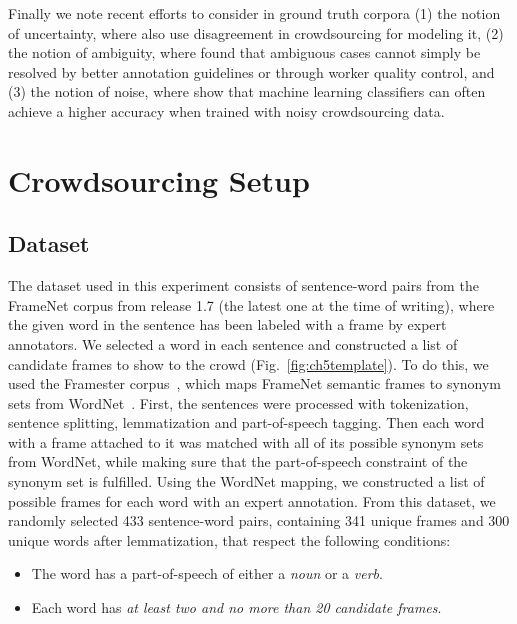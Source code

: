 Finally we note recent efforts to consider in ground truth corpora (1) the notion of uncertainty, where \citet{schaekermann2016} also use disagreement in crowdsourcing for modeling it, (2) the notion of ambiguity, where \citet{Chang:2017:Revolt} found that ambiguous cases cannot simply be resolved by better annotation guidelines or through worker quality control, and (3) the notion of noise, where \citet{lin2014re} show that machine learning classifiers can often achieve a higher accuracy when trained with noisy crowdsourcing data.


\section{Crowdsourcing Setup}
\label{sec:frame-crowd-setup}

\subsection{Dataset}

The dataset used in this experiment consists of sentence-word pairs from the FrameNet corpus from release 1.7 (the latest one at the time of writing), where  the given word in the sentence has been labeled with a frame by expert annotators. We selected a word in each sentence and constructed a list of candidate frames to show to the crowd (Fig.~\ref{fig:ch5template}). To do this, we used the Framester corpus~\cite{gangemi2016framester}, which maps FrameNet semantic frames to synonym sets from WordNet~\cite{miller1995wordnet}. First, the sentences were processed with tokenization, sentence splitting, lemmatization and part-of-speech tagging. Then each word with a frame attached to it was matched with all of its possible synonym sets from WordNet, while making sure that the part-of-speech constraint of the synonym set is fulfilled. Using the WordNet mapping, we constructed a list of possible frames for each word with an expert annotation. From this dataset, we randomly selected 433 sentence-word pairs, containing 341 unique frames and 300 unique words after lemmatization, that respect the following conditions:

\begin{itemize}

\item The word has a part-of-speech of either a \textit{noun} or a \textit{verb}.

\item Each word has \textit{at least two and no more than 20 candidate frames}.

\end{itemize}

